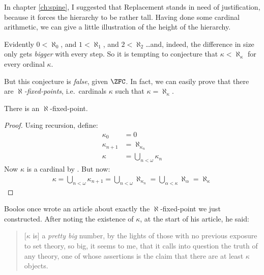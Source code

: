 \documentclass[../../../include/open-logic-section]{subfiles}
\begin{document}
In chapter \ref{ch:spine}, I suggested that Replacement stands in need of justification, because it forces the hierarchy to be rather tall. Having done some cardinal arithmetic, we can give a little illustration of the height of the hierarchy. 

Evidently $0 < \aleph_0$, and $1 < \aleph_1$, and $2 < \aleph_2$\ldots and, indeed, the difference in size only gets \emph{bigger} with every step. So it is tempting to conjecture that $\kappa < \aleph_\kappa$ for every ordinal $\kappa$. 

But this conjecture is \emph{false}, given $\ZFC$. In fact, we can easily prove that there are \emph{$\aleph$-fixed-points}, i.e.\ cardinals $\kappa$ such that $\kappa=\aleph_\kappa$. 
\begin{prop}
	There is an $\aleph$-fixed-point.
\end{prop}
\begin{proof}
	Using recursion, define:
	\begin{align*}
		\kappa_0 &= 0\\
		\kappa_{n+1} &= \aleph_{\kappa_n}\\
		\kappa &= \bigcup_{n < \omega}\kappa_n
	\end{align*}
	Now $\kappa$ is a cardinal by . But now:
	\begin{align*}
		\kappa = \bigcup_{n < \omega} \kappa_{n+1} = \bigcup_{n < \omega}\aleph_{\kappa_n} = \bigcup_{\alpha < \kappa}\aleph_\alpha = \aleph_\kappa 
	\end{align*}
\end{proof}\noindent
Boolos once wrote an article about exactly the $\aleph$-fixed-point we just constructed. After noting the existence of $\kappa$, at the start of his article, he said:
\begin{quote}
	[$\kappa$ is] a \emph{pretty big} number, by the lights of those with no previous exposure to  set theory,  so big, it seems to me, that  it calls into question the truth of any theory, one of whose assertions is the claim that there are at least $\kappa$ objects. \citep[257]{Boolos2000}
\end{quote}
\end{document}
